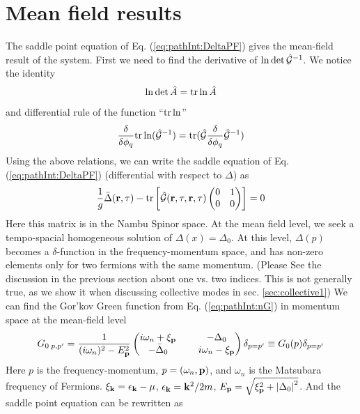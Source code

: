 \section{Mean field results\label{sec:pathInt:meanfield}}
The saddle point equation of Eq. (\ref{eq:pathInt:DeltaPF}) gives the mean-field result of the system.  First we need to find the derivative of $\ln\det\hat{\mathcal{G}}^{-1}$.  We notice the identity
\begin{equation}
\ln\det\hat{A}=\text{tr}\ln\hat{A}
\end{equation}
and differential rule of the function ``$\text{tr}\ln$''
\begin{equation}\label{eq:pathInt:diffTr}
\frac{\delta}{\delta\phi_q}\text{tr}\ln(\hat{\mathcal{G}}^{-1})=\text{tr}(\hat{\mathcal{G}}\frac{\delta}{\delta\phi_q}\hat{\mathcal{G}}^{-1})
\end{equation}
Using the above relations, we can write the saddle equation of Eq. (\ref{eq:pathInt:DeltaPF}) (differential with respect to $\Delta$) as
\begin{equation}
\frac{1}{g}\bar{\Delta}(\mathbf{r},\tau)-\text{tr}\left[\hat{\mathcal{G}}(\mathbf{r},\tau,\mathbf{r},\tau)\begin{pmatrix}0&1\\0&0\end{pmatrix}\right]=0
\end{equation}
Here this matrix is in the Nambu Spinor space.  At the  mean field level, we seek a tempo-spacial homogeneous solution of $\Delta(x)=\Delta_{0}$.  At this level,  $\Delta(p)$ becomes a $\delta$-function in the frequency-momentum space, and has non-zero elements only for two fermions with the same momentum.  (Please See the discussion in the previous section about one vs. two indices. This is not generally true, as we show it when discussing collective modes in sec. \ref{sec:collective1})
We can find the Gor'kov Green function from Eq. (\ref{eq:pathInt:nG}) in momentum space at the mean-field level
\begin{equation}\label{eq:pathInt:G0}
G_{0\;p,p'}=\frac{1}{(i\omega_n)^2-E_{\mathbf{p}}^2}
\begin{pmatrix}
	i\omega_n+\xi_{\mathbf{p}}&\;&-\Delta_0\\
	-\bar{\Delta}_0&\;&i\omega_n-\xi_{\mathbf{p}}
\end{pmatrix}
\delta_{p=p'}
\equiv{}G_{0}(p)\delta_{p=p'}
\end{equation}
Here $p$ is the frequency-momentum, $p=(\omega_{n},\mathbf{p})$, and $\omega_n$ is the Matsubara frequency of Fermions.  $\xi_{\mathbf{k}}=\epsilon_{\mathbf{k}}-\mu$, $\epsilon_{\mathbf{k}}=\mathbf{k}^{2}/2m$,  $E_{\mathbf{p}}=\sqrt{\xi_{\mathbf{p}}^2+\left\lvert{\Delta_0}\right\rvert^2}$.  And the saddle point equation can be rewritten as 
